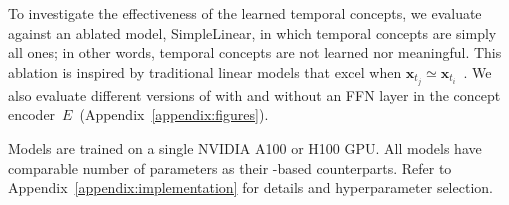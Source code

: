 %
To investigate the effectiveness of the learned temporal concepts, we evaluate against an ablated model, SimpleLinear, in which temporal concepts are simply all ones; in other words, temporal concepts are not learned nor meaningful. This ablation is inspired by traditional linear models that excel when $\mathbf{x}_{t_j} \simeq \mathbf{x}_{t_i}$~\cite{toner2024analysis, ahlmann2024deep}. We also evaluate different versions of \name with and without an FFN layer in the concept encoder~$E$~(Appendix~\ref{appendix:figures}).

%
Models are trained on a single NVIDIA A100 or H100 GPU. All models have comparable number of parameters as their \name-based counterparts. Refer to Appendix~\ref{appendix:implementation} for details and hyperparameter selection.
